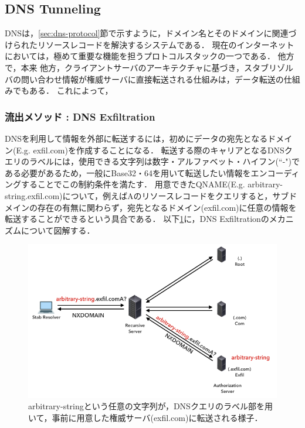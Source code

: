 \subsection{DNS Tunneling}
DNSは，\ref{sec:dns-protocol}節で示すように，ドメイン名とそのドメインに関連づけられたリソースレコードを解決するシステムである．
現在のインターネットにおいては，極めて重要な機能を担うプロトコルスタックの一つである．
他方で，本来
他方，クライアントサーバのアーキテクチャに基づき，スタブリゾルバの問い合わせ情報が権威サーバに直接転送される仕組みは，データ転送の仕組みでもある．
これによって，
\subsubsection{流出メソッド : DNS Exfiltration}
\label{sec:dns-exfiltration}
DNSを利用して情報を外部に転送するには，初めにデータの宛先となるドメイン(E.g. exfil.com)を作成することになる．
転送する際のキャリアとなるDNSクエリのラベルには，使用できる文字列は数字・アルファベット・ハイフン(``-")である必要があるため，一般にBase32・64を用いて転送したい情報をエンコーディングすることでこの制約条件を満たす．
用意できたQNAME(E.g. arbitrary-string.exfil.com)について，例えばAのリソースレコードをクエリすると，サブドメインの存在の有無に関わらず，宛先となるドメイン(exfil.com)に任意の情報を転送することができるという具合である．
以下\ref{fig:dns-exfiltration}に，DNS Exfiltrationのメカニズムについて図解する．

\begin{figure}[h]
 \centering
 \includegraphics[width=12.0cm]{figure/dns-exfiltration.png}
 \caption{arbitrary-stringという任意の文字列が，DNSクエリのラベル部を用いて，事前に用意した権威サーバ(exfil.com)に転送される様子．}
 \label{fig:dns-exfiltration}
\end{figure}


